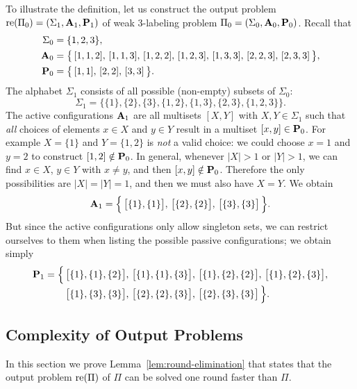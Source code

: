 To illustrate the definition, let us construct the output problem $\operatorname{re}(\Pi_0) = (\Sigma_1, \mathbf{A}_1, \mathbf{P}_1)$ of weak 3-labeling problem $\Pi_0 = (\Sigma_0, \mathbf{A}_0, \mathbf{P}_0)$. Recall that
\begin{align*}
	\Sigma_0 &= \{ 1,2,3 \}, \\
	\mathbf{A}_0 &= \bigl\{\,
		[ 1, 1, 2 ],\,
		[ 1, 1, 3 ],\,
		[ 1, 2, 2 ],\,
		[ 1, 2, 3 ],\,
		[ 1, 3, 3 ],\,
		[ 2, 2, 3 ],\,
		[ 2, 3, 3 ]
	\,\bigr\}, \\
	\mathbf{P}_0 &= \bigl\{\,
		[ 1, 1 ],\,
		[ 2, 2 ],\,
		[ 3, 3 ]
	\,\bigr\}. 
\end{align*}
The alphabet $\Sigma_1$ consists of all possible (non-empty) subsets of $\Sigma_0$: 
\[
	\Sigma_1 = \bigl\{ \{ 1 \}, \{ 2 \}, \{ 3 \}, \{ 1, 2 \}, \{ 1, 3 \}, \{ 2, 3 \}, \{ 1, 2, 3 \} \bigr\}.
\]
The active configurations $\mathbf{A}_1$ are all multisets $[ X,Y ]$ with $X, Y \in \Sigma_1$ such that \emph{all} choices of elements $x \in X$ and $y \in Y$ result in a multiset $[x,y] \in \mathbf{P}_0$. For example $X = \{1\}$ and $Y = \{1,2\}$ is \emph{not} a valid choice: we could choose $x = 1$ and $y = 2$ to construct $[1,2] \notin \mathbf{P}_0$. In general, whenever $|X| > 1$ or $|Y| > 1$, we can find $x \in X$, $y \in Y$ with $x \ne y$, and then $[x,y] \notin \mathbf{P}_0$. Therefore the only possibilities are $|X| = |Y| = 1$, and then we must also have $X = Y$. We obtain
\[ 
\mathbf{A}_1 = \Bigl\{\, \bigl[\{ 1 \}, \{1 \}\bigr],\, \bigl[\{ 2 \}, \{2 \}\bigr],\, \bigl[\{ 3 \}, \{3 \}\bigr] \,\Bigr\}. 
\] 
But since the active configurations only allow singleton sets, we can restrict ourselves to them when listing the possible passive configurations; we obtain simply
\[
\begin{split}
	\mathbf{P}_1 = \Bigl\{\,
		&\bigl[ \{1\}, \{1\}, \{2\} \bigr],\,
		\bigl[ \{1\}, \{1\}, \{3\} \bigr],\,
		\bigl[ \{1\}, \{2\}, \{2\} \bigr],\,
		\bigl[ \{1\}, \{2\}, \{3\} \bigr],\\[-2pt]
		&\bigl[ \{1\}, \{3\}, \{3\} \bigr],\,
		\bigl[ \{2\}, \{2\}, \{3\} \bigr],\,
		\bigl[ \{2\}, \{3\}, \{3\} \bigr]
	\,\Bigr\}.
\end{split}
\]

\subsection{Complexity of Output Problems}

In this section we prove Lemma~\ref{lem:round-elimination} that states that the output problem $\operatorname{re}(\Pi)$ of $\Pi$ can be solved one round faster than $\Pi$. 

